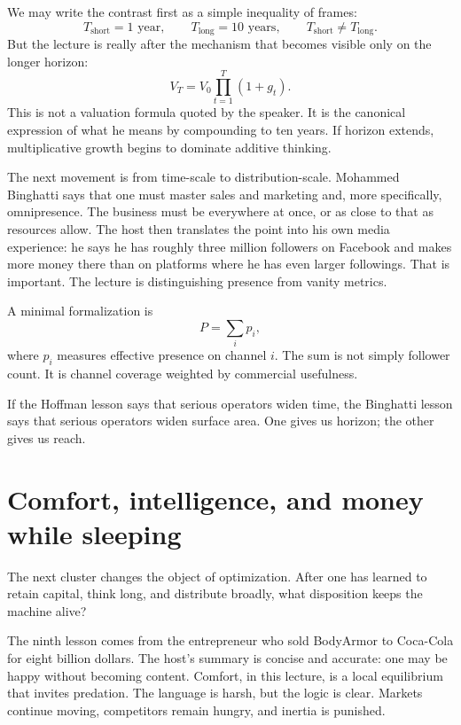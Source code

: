 We may write the contrast first as a simple inequality of frames:
\begin{equation}
T_{\mathrm{short}} = 1 \text{ year}, \qquad T_{\mathrm{long}} = 10 \text{ years}, \qquad T_{\mathrm{short}} \neq T_{\mathrm{long}}.
\end{equation}
But the lecture is really after the mechanism that becomes visible only on the longer horizon:
\begin{equation}
V_T = V_0 \prod_{t=1}^{T} (1+g_t).
\end{equation}
This is not a valuation formula quoted by the speaker. It is the canonical expression of what he means by compounding to ten years. If horizon extends, multiplicative growth begins to dominate additive thinking.

The next movement is from time-scale to distribution-scale. Mohammed Binghatti says that one must master sales and marketing and, more specifically, omnipresence. The business must be everywhere at once, or as close to that as resources allow. The host then translates the point into his own media experience: he says he has roughly three million followers on Facebook and makes more money there than on platforms where he has even larger followings. That is important. The lecture is distinguishing presence from vanity metrics.

A minimal formalization is
\begin{equation}
P = \sum_i p_i,
\end{equation}
where \(p_i\) measures effective presence on channel \(i\). The sum is not simply follower count. It is channel coverage weighted by commercial usefulness.

If the Hoffman lesson says that serious operators widen time, the Binghatti lesson says that serious operators widen surface area. One gives us horizon; the other gives us reach.

\section{Comfort, intelligence, and money while sleeping}

The next cluster changes the object of optimization. After one has learned to retain capital, think long, and distribute broadly, what disposition keeps the machine alive?

The ninth lesson comes from the entrepreneur who sold BodyArmor to Coca-Cola for eight billion dollars. The host's summary is concise and accurate: one may be happy without becoming content. Comfort, in this lecture, is a local equilibrium that invites predation. The language is harsh, but the logic is clear. Markets continue moving, competitors remain hungry, and inertia is punished.

